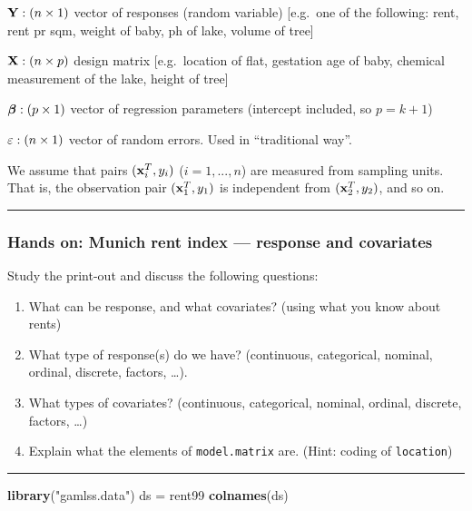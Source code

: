 \documentclass[
]{article}
\newenvironment{Shaded}{\begin{snugshade}}{\end{snugshade}}
\newcommand{\FunctionTok}[1]{\textcolor[rgb]{0.13,0.29,0.53}{\textbf{#1}}}
\newcommand{\NormalTok}[1]{#1}
\newcommand{\OtherTok}[1]{\textcolor[rgb]{0.56,0.35,0.01}{#1}}
\newcommand{\StringTok}[1]{\textcolor[rgb]{0.31,0.60,0.02}{#1}}
\providecommand{\tightlist}{%
  \setlength{\itemsep}{0pt}\setlength{\parskip}{0pt}}
\begin{document}
\({\bf Y}: (n \times 1)\) vector of responses (random variable)
{[}e.g.~one of the following: rent, rent pr sqm, weight of baby, ph of
lake, volume of tree{]}

\({\bf X}: (n \times p)\) design matrix {[}e.g.~location of flat,
gestation age of baby, chemical measurement of the lake, height of
tree{]}

\({\bf \boldsymbol{\beta}}: (p \times 1)\) vector of regression
parameters (intercept included, so \(p=k+1\))

\({\bf \varepsilon}: (n\times 1)\) vector of random errors. Used in
``traditional way''.

We assume that pairs \(({\bf x}_i^T,y_i)\) (\(i=1,...,n\)) are measured
from sampling units. That is, the observation pair \(({\bf x}_1^T,y_1)\)
is independent from \(({\bf x}_2^T,y_2)\), and so on.

\begin{center}\rule{0.5\linewidth}{0.5pt}\end{center}

\hypertarget{hands-on-munich-rent-index-response-and-covariates}{%
\subsubsection{Hands on: Munich rent index --- response and
covariates}\label{hands-on-munich-rent-index-response-and-covariates}}

Study the print-out and discuss the following questions:

\begin{enumerate}
\def\labelenumi{\alph{enumi})}
\tightlist
\item
  What can be response, and what covariates? (using what you know about
  rents)
\item
  What type of response(s) do we have? (continuous, categorical,
  nominal, ordinal, discrete, factors, \ldots).
\item
  What types of covariates? (continuous, categorical, nominal, ordinal,
  discrete, factors, \ldots)
\item
  Explain what the elements of \texttt{model.matrix} are. (Hint: coding
  of \texttt{location})
\end{enumerate}

\begin{center}\rule{0.5\linewidth}{0.5pt}\end{center}

\begin{Shaded}
\begin{Highlighting}[]
\FunctionTok{library}\NormalTok{(}\StringTok{"gamlss.data"}\NormalTok{)}
\NormalTok{ds }\OtherTok{=}\NormalTok{ rent99}
\FunctionTok{colnames}\NormalTok{(ds)}
\end{Highlighting}
\end{Shaded}
\end{document}

